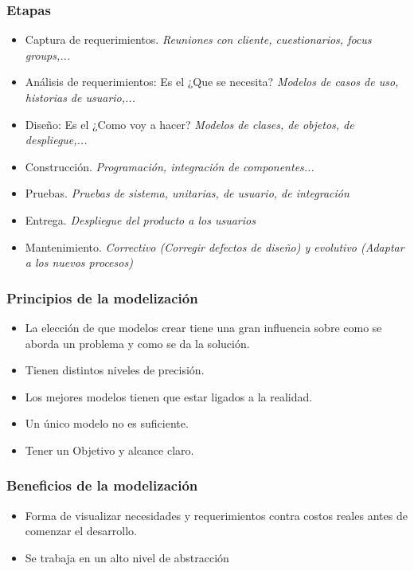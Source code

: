 \documentclass[titlepage,a4paper]{article}
\begin{document}
\subsubsection*{Etapas}
    \begin{itemize}
        \item Captura de requerimientos. \textit{Reuniones con cliente, cuestionarios, focus groups,...}
        \item Análisis de requerimientos: Es el ¿Que se necesita? \textit{Modelos de casos de uso, historias de usuario,...}
        \item Diseño: Es el ¿Como voy a hacer? \textit{Modelos de clases, de objetos, de despliegue,...}
        \item Construcción. \textit{Programación, integración de componentes...}
        \item Pruebas. \textit{Pruebas de sistema, unitarias, de usuario, de integración}
        \item Entrega. \textit{Despliegue del producto a los usuarios}
        \item Mantenimiento. \textit{Correctivo (Corregir defectos de diseño) y evolutivo (Adaptar a los nuevos procesos)}
    \end{itemize}

\subsubsection*{Principios de la modelización}
    \begin{itemize}
        \item La elección de que modelos crear tiene una gran influencia sobre como se aborda un problema y como se da la solución.
        \item Tienen distintos niveles de precisión.
        \item Los mejores modelos tienen que estar ligados a la realidad.
        \item Un único modelo no es suficiente.
        \item Tener un Objetivo y alcance claro.
    \end{itemize}

\subsubsection*{Beneficios de la modelización}
    \begin{itemize}
        \item Forma de visualizar necesidades y requerimientos contra costos reales antes de comenzar el desarrollo.
        \item Se trabaja en un alto nivel de abstracción
    \end{itemize}
\end{document}
